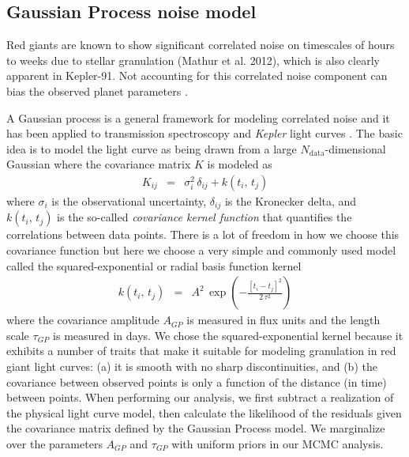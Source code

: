 \documentclass[apjl]{emulateapj}
\begin{document}
\subsection{Gaussian Process noise model}
Red giants are known to show significant correlated noise on timescales of hours to weeks due to stellar granulation (Mathur et al. 2012), which is also clearly apparent in Kepler-91. Not accounting for this correlated noise component can bias the observed planet parameters \citep{carter09}.

A Gaussian process is a general framework for modeling correlated noise
\citep{rasmussen} and it has been applied to transmission spectroscopy
\citep{gibson-gp,evans-gp} and \emph{Kepler} light curves \citep[][Dawson
\emph{et al.}\ in press]{ambikasaran14}.
The basic idea is to model the light curve as being drawn from a large
$N_\mathrm{data}$-dimensional Gaussian where the covariance matrix $K$ is
modeled as
\begin{eqnarray}
K_{ij} &=& \sigma_i^2\,\delta_{ij} + k(t_i,\,t_j)
\end{eqnarray}
where $\sigma_i$ is the observational uncertainty, $\delta_{ij}$ is the
Kronecker delta, and $k(t_i,\,t_j)$ is the so-called \emph{covariance kernel
function} that quantifies the correlations between data points.
There is a lot of freedom in how we choose this covariance function but here
we choose a very simple and commonly used model called the
squared-exponential or radial basis function kernel
\begin{eqnarray}
k(t_i,\,t_j) &=& A^2\,\exp\left(-\frac{[t_i-t_j]^2}{2\,\tau^2}\right)
\end{eqnarray}
where the covariance amplitude $A_{GP}$ is measured in flux units and the length
scale $\tau_{GP}$ is measured in days. We chose the squared-exponential kernel because it exhibits a number of traits that make it suitable for modeling granulation in red giant light curves: (a) it is smooth with no sharp discontinuities, and (b) the covariance between observed points is only a function of the distance (in time) between points.
When performing our analysis, we first subtract a realization of the physical light curve model, then calculate the likelihood of the residuals given the covariance matrix defined by the Gaussian Process model. We marginalize over the parameters $A_{GP}$ and $\tau_{GP}$ with uniform priors in our MCMC analysis.
\end{document}
